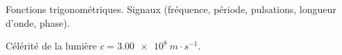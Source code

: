 \def\AEFcouleurBleu{\couleurNBouCouleur{black}{blue}}
\def\AEFcouleurRouge{\couleurNBouCouleur{gray}{red}}






\debutFicheEntrainement                                                                      %




\begin{prerequis}
	Fonctions trigonométriques. Signaux (fréquence, période, pulsations, longueur d’onde, phase).
	
	\constantesUtiles
	\begin{listeConstantes}
		\item Célérité de la lumière $c = \SI{3.00e8}{m \cdot s^{-1}}$.
	\end{listeConstantes}
\end{prerequis}












